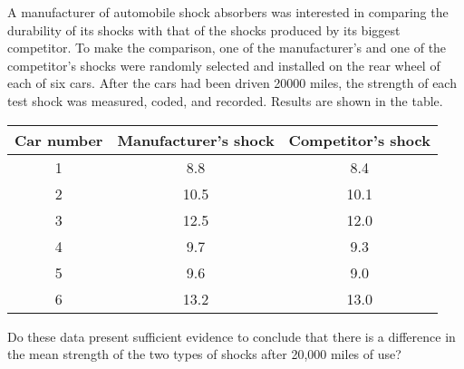 
\begin{exercise}

    A manufacturer of automobile shock absorbers was interested in comparing the durability of
    its shocks with that of the shocks produced by its biggest competitor. To make the comparison,
    one of the manufacturer’s and one of the competitor’s shocks were randomly selected
    and installed on the rear wheel of each of six cars. After the cars had been driven 20000
    miles, the strength of each test shock was measured, coded, and recorded. Results are shown
    in the table.

    \begin{center}
        \begin{tabular}{c | c c } 
        \textbf{Car number} & \textbf{Manufacturer's shock} & \textbf{Competitor's shock} \\  
        \hline
        1 & 8.8 & 8.4 \\
        2 & 10.5 & 10.1 \\
        3 & 12.5 & 12.0 \\
        4 & 9.7 & 9.3 \\
        5 & 9.6 & 9.0 \\
        6 & 13.2 & 13.0 \\
        \hline
       \end{tabular}
       
    \end{center}

    Do these data present sufficient evidence to conclude that there is 
    a difference in the mean strength of the two types of shocks after
    20,000 miles of use?

\end{exercise}


